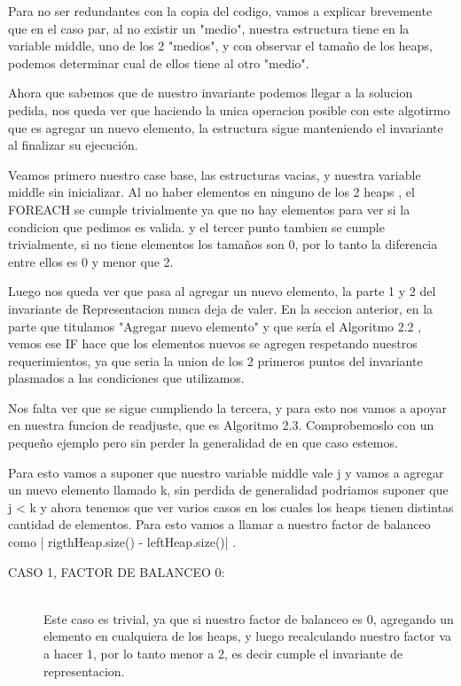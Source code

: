 {Para no ser redundantes con la copia del codigo, vamos a explicar brevemente que en el caso par, al no existir un "medio", nuestra estructura tiene en la variable middle, uno de los 2 "medios", y con observar el tama\~no de los heaps, podemos determinar cual de ellos tiene al otro "medio".

Ahora que sabemos que de nuestro invariante podemos llegar a la solucion pedida, nos queda ver que haciendo la unica operacion posible con este algotirmo que es agregar un nuevo elemento, la estructura sigue manteniendo el invariante al finalizar su ejecuci\'on.

Veamos primero nuestro case base, las estructuras vacias, y nuestra variable middle sin inicializar. Al no haber elementos en ninguno de los 2 heaps , el FOREACH se cumple trivialmente ya que no hay elementos para ver si la condicion que pedimos es valida. y el tercer punto tambien se cumple trivialmente, si no tiene elementos los tama\~nos son 0, por lo tanto la diferencia entre ellos es 0 y menor que 2.

Luego nos queda ver que pasa al agregar un nuevo elemento, la parte 1 y 2 del invariante de Representacion nunca deja de valer. En la seccion anterior, en la parte que titulamos "Agregar nuevo elemento" y que ser\'ia el Algoritmo 2.2 , vemos ese IF hace que los elementos nuevos se agregen respetando nuestros requerimientos, ya que seria la union de los 2 primeros puntos del invariante plasmados a las condiciones que utilizamos.

Nos falta ver que se sigue cumpliendo la tercera, y para esto nos vamos a apoyar en nuestra funcion de readjuste, que es Algoritmo 2.3. Comprobemoslo con un peque\~no ejemplo pero sin perder la generalidad de en que caso estemos.

Para esto vamos a suponer que nuestro variable middle vale j y vamos a agregar un nuevo elemento llamado k, sin perdida de generalidad podriamos suponer  que j < k y ahora tenemos que ver varios casos en los cuales los heaps tienen distintas cantidad de elementos. Para esto vamos a llamar a nuestro factor de balanceo como | rigthHeap.size() - leftHeap.size()| .

  
\begin{description}
\item[CASO 1, FACTOR DE BALANCEO 0:] \hfill \\
    Este caso es trivial, ya que si nuestro factor de balanceo es 0, agregando un elemento en cualquiera de los heaps, y luego recalculando nuestro factor va a hacer 1, por lo tanto menor a 2, es decir cumple el invariante de representacion.


\end{description}}
